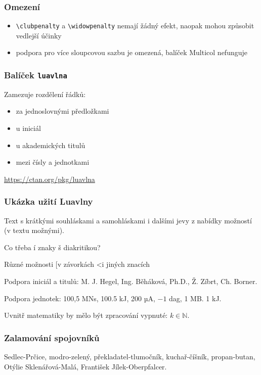 \begin{frame}[fragile]
  \frametitle{Omezení}
    \begin{itemize}
      \item \verb|\clubpenalty| a \verb|\widowpenalty| nemají žádný efekt, naopak mohou způsobit vedlejší účinky
      \item  podpora pro více sloupcovou sazbu je omezená, balíček Multicol nefunguje
  \end{itemize}
\end{frame}
 

\begin{frame}[fragile]
  \frametitle{Balíček \texttt{luavlna}}
    Zamezuje rozdělení řádků:
      \begin{itemize}
        \item za jednoslovnými předložkami
        \item u iniciál
        \item u akademických titulů
        \item mezi čísly a jednotkami
      \end{itemize}
  \url{https://ctan.org/pkg/luavlna}
\end{frame}

\begin{frame}
  \frametitle{Ukázka užití Luavlny}
  \begin{minipage}{3in}

    \preventsingledebugon

    Text s krátkými souhláskami a samohláskami i dalšími jevy
    z nabídky možností (v textu možnými).

    Co třeba í znaky š diakritikou?

    Různé možnosti [v závorkách \textless i jiných znacích

    Podpora iniciál a titulů: M. J. Hegel, Ing. Běháková, Ph.D., Ž. Zíbrt,
    Ch. Borner.

    Podpora jednotek: 100,5 MN\cdot{}s, 100.5 kJ, 200 µA, $-1$ dag, 1 MB. 1 kJ.

    Uvnitř matematiky by mělo být zpracování vypnuté: $k \in \mathbb N$.

    \preventsingledebugoff
  \end{minipage}
\end{frame}

\begin{frame}
    \frametitle{Zalamování spojovníků}
    \begin{center}
    \begin{minipage}{2in}
      Sedlec-Prčice, modro-zelený, překladatel-tlumočník, kuchař-číšník, propan-butan, Otýlie Sklenářová-Malá, František Jílek-Oberpfalcer.
    \end{minipage}
  \end{center}
\end{frame}

